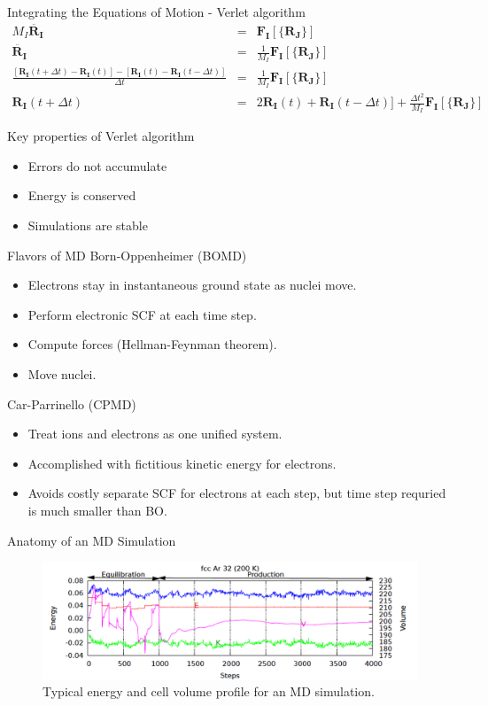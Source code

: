 \documentclass[aspectratio=169]{beamer}
\let \vec \mathbf
\begin{document}
\begin{frame}{Integrating the Equations of Motion - Verlet algorithm}
\begin{eqnarray*}
M_I \ddot{\vec{R_I}} & = &  \vec{F_I}[\{\vec{R_J}\}]\\
\ddot{\vec{R_I}} & = & \frac{1}{M_I} \vec{F_I}[\{\vec{R_J}\}]\\
\frac{[\vec{R_I}(t+\Delta t)-\vec{R_I}(t)]-[\vec{R_I}(t)-\vec{R_I}(t-\Delta t)]}{\Delta t} & = & \frac{1}{M_I} \vec{F_I}[\{\vec{R_J}\}]\\
\vec{R_I}(t+\Delta t) & = & 2\vec{R_I}(t) + \vec{R_I}(t-\Delta t)]+\frac{\Delta t^2}{M_I} \vec{F_I}[\{\vec{R_J}\}]
\end{eqnarray*} 

Key properties of Verlet algorithm
\begin{itemize}
    \item Errors do not accumulate
    \item Energy is conserved
    \item Simulations are stable 
\end{itemize}
\end{frame} 

\begin{frame}{Flavors of MD}
Born-Oppenheimer (BOMD)
\begin{itemize}
    \item Electrons stay in instantaneous ground state as nuclei move.
    \item Perform electronic SCF at each time step.
    \item Compute forces (Hellman-Feynman theorem).
    \item Move nuclei.
\end{itemize}

Car-Parrinello (CPMD)\cite{carUnifiedApproachMolecular1985}
\begin{itemize}
    \item Treat ions and electrons as one unified system.
    \item Accomplished with fictitious kinetic energy for electrons.
    \item Avoids costly separate SCF for electrons at each step, but time step requried is much smaller than BO.
\end{itemize}

\end{frame} 

\begin{frame}{Anatomy of an MD Simulation}
\begin{figure}
    \centering
    \includegraphics[width=\linewidth]{lectures/figures/13-MD_simulation.png}
    \caption{Typical energy and cell volume profile for an MD simulation.}
\end{figure} 
\end{frame} 
\end{document}
